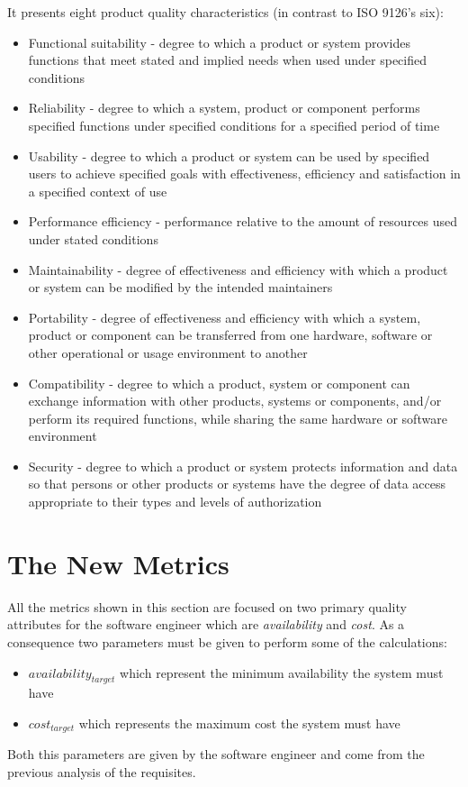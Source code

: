 It presents eight product quality characteristics (in contrast to ISO 9126's six):
\begin{itemize}
	\item Functional suitability - degree to which a product or system provides functions that meet stated and implied needs when used under specified conditions
	\item Reliability - degree to which a system, product or component performs specified functions under specified conditions for a specified period of time
	\item Usability - degree to which a product or system can be used by specified users to achieve specified goals with effectiveness, efficiency and satisfaction in a specified context of use
	\item Performance efficiency - performance relative to the amount of resources used under stated conditions
	\item Maintainability - degree of effectiveness and efficiency with which a product or system can be modified by the intended maintainers
	\item Portability - degree of effectiveness and efficiency with which a system, product or component can be transferred from one hardware, software or other operational or usage environment to another
	\item Compatibility - degree to which a product, system or component can exchange information with other products, systems or components, and/or perform its required functions, while sharing the same hardware or software environment
	\item Security - degree to which a product or system protects information and data so that persons or other products or systems have the degree of data access appropriate to their types and levels of authorization
\end{itemize}

\section{The New Metrics}
\label{sec:new-metrics}
All the metrics shown in this section are focused on two primary quality attributes for the software engineer which are \emph{availability} and \emph{cost}. As a consequence two parameters must be given to perform some of the calculations:
\begin{itemize}
	\item \emph{$availability_{target}$} which represent the minimum availability the system must have
	\item \emph{$cost_{target}$} which represents the maximum cost the system must have
\end{itemize}
Both this parameters are given by the software engineer and come from the previous analysis of the requisites.

